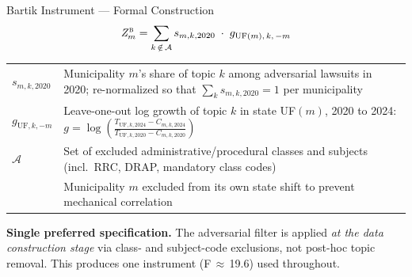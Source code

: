 \documentclass[aspectratio=169,10pt]{beamer}
\newcommand{\bZ}{\mathit{Z}_{m}^{\textsc{b}}}
\begin{document}
\begin{frame}{Bartik Instrument --- Formal Construction}
\[
\bZ = \sum_{k \,\notin\, \mathcal{A}} s_{m,k,2020} \;\cdot\; g_{\text{UF}(m),\,k,\,-m}
\]
\bigskip
\renewcommand{\arraystretch}{1.4}
\begin{tabularx}{\textwidth}{L{2.4cm}X}
  $s_{m,k,2020}$ & Municipality $m$'s share of topic $k$ among adversarial lawsuits in 2020; re-normalized so that $\sum_k s_{m,k,2020} = 1$ per municipality \\
  $g_{\text{UF},k,-m}$ & Leave-one-out log growth of topic $k$ in state UF$(m)$, 2020 to 2024:
  $\displaystyle g = \log\!\!\left(\frac{T_{\text{UF},k,2024} - C_{m,k,2024}}{T_{\text{UF},k,2020} - C_{m,k,2020}}\right)$ \\
  $\mathcal{A}$ & Set of excluded administrative/procedural classes and subjects (incl.\ RRC, DRAP, mandatory class codes) \\
   & Municipality $m$ excluded from its own state shift to prevent mechanical correlation \\
\end{tabularx}
\medskip
\begin{alertblock}{}
\footnotesize\textbf{Single preferred specification.} The adversarial filter is applied \emph{at the data construction stage} via class- and subject-code exclusions, not post-hoc topic removal. This produces one instrument (F\,$\approx$\,19.6) used throughout.
\end{alertblock}
\end{frame}
\end{document}
